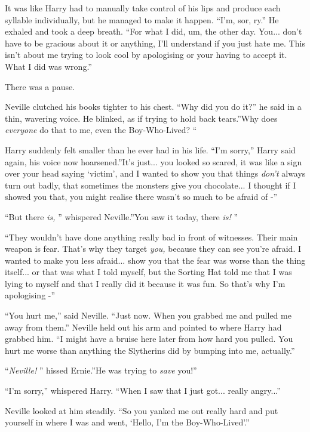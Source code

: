It was like Harry had to manually take control of his lips and produce
each syllable individually, but he managed to make it happen. ``I'm,
sor, ry.'' He exhaled and took a deep breath. ``For what I did, um, the
other day. You... don't have to be gracious about it or anything,
I'll understand if you just hate me. This isn't about me trying to look
cool by apologising or your having to accept it. What I did was wrong.''

There was a pause.

Neville clutched his books tighter to his chest. ``Why did you do it?''
he said in a thin, wavering voice. He blinked, as if trying to hold back
tears.''Why does \emph{everyone} do that to me, even the Boy-Who-Lived?
``

Harry suddenly felt smaller than he ever had in his life. ``I'm sorry,''
Harry said again, his voice now hoarsened.''It's just... you looked
so scared, it was like a sign over your head saying `victim', and I
wanted to show you that things \emph{don't} always turn out badly, that
sometimes the monsters give you chocolate... I thought if I showed
you that, you might realise there wasn't so much to be afraid of -''

``But there \emph{is,} '' whispered Neville.''You saw it today, there
\emph{is!} ''

``They wouldn't have done anything really bad in front of witnesses.
Their main weapon is fear. That's why they target \emph{you,} because
they can see you're afraid. I wanted to make you less afraid...
show you that the fear was worse than the thing itself... or that
was what I told myself, but the Sorting Hat told me that I was lying to
myself and that I really did it because it was fun. So that's why I'm
apologising -''

``You hurt me,'' said Neville. ``Just now. When you grabbed me and
pulled me away from them.'' Neville held out his arm and pointed to
where Harry had grabbed him. ``I might have a bruise here later from how
hard you pulled. You hurt me worse than anything the Slytherins did by
bumping into me, actually.''

``\emph{Neville!} '' hissed Ernie.''He was trying to \emph{save} you!''

``I'm sorry,'' whispered Harry. ``When I saw that I just got...
really angry...''

Neville looked at him steadily. ``So you yanked me out really hard and
put yourself in where I was and went, `Hello, I'm the Boy-Who-Lived'.''

